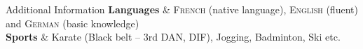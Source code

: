 %
%
%

\begin{rubriquetableau}[\offsetintab]{Additional Information}
    \textbf{Languages}
    & \textsc{French} (native language), \textsc{English}
    (fluent) and \textsc{German} (basic knowledge)
    \\
    \textbf{Sports}
    & Karate (Black belt -- {\small 3rd DAN}, \acf{DIF}), Jogging, Badminton, Ski
    etc.
    \\
\end{rubriquetableau}

%
